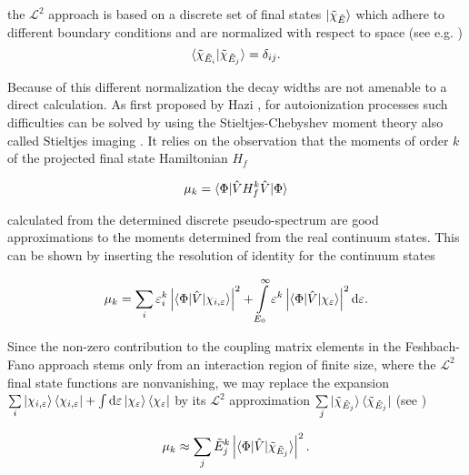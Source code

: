\documentclass[aps,amssymb,preprint,a4paper,longbibliography]{revtex4}
\begin{document}
the $\mathcal{L}^2$ approach is based on a discrete set of final states
$\ket{\tilde{\chi}_{\tilde{E}}}$
which adhere to different boundary
conditions and are normalized with respect to space (see e.g. \cite{Craigie14})
\begin{equation}
 \braket{ \tilde{\chi}_{\tilde{E}_i} | \tilde{\chi}_{\tilde{E}_j} } = \delta_{ij}.
\end{equation}

Because of this different normalization the decay widths are not amenable to
a direct calculation. As first proposed by Hazi \cite{hazi1978}, for
autoionization processes such difficulties
can be solved by using the
Stieltjes-Chebyshev moment theory also called Stieltjes imaging
\cite{Langhoff76,Corcoran77,MuellerPlathe90}.
It relies on the observation that the moments of order $k$ of the projected final
state Hamiltonian $H_f$

\begin{equation}
 \mu_k = \braket{ \Phi | \hat{V} H^k_f \hat{V} | \Phi }
\end{equation}

calculated from the determined
discrete pseudo-spectrum are good approximations to the moments determined
from the real continuum states.
This can be shown by inserting the resolution of identity for
the continuum states

\begin{equation}
 \mu_k = \sum_i \varepsilon_i^k
         \left| \braket{ \Phi | \hat{V} | \chi_{i,\varepsilon} } \right| ^2
       + \int\limits_{E_{0}}^{\infty} \varepsilon^k
         \left| \braket{\Phi|\hat{V}|\chi_{\varepsilon}} \right|^2 \mathrm{d}\varepsilon  .
\end{equation}

Since the non-zero contribution to the coupling matrix elements in the
Feshbach-Fano approach stems only
from an interaction region of finite size, where the $\mathcal{L}^2$ final
state functions are nonvanishing, we may replace the expansion
$\sum\limits_i \ket{\chi_{i,\varepsilon}} \bra{\chi_{i,\varepsilon}}
 + \int \mathrm{d}\varepsilon \ket{\chi_\varepsilon} \bra{\chi_\varepsilon}$
by its $\mathcal{L}^2$ approximation
$\sum\limits_j \ket{\tilde{\chi}_{\tilde{E}_j}} \bra{\tilde{\chi}_{\tilde{E}_j}}$
(see \cite{Reinhardt79})

\begin{equation}
 \label{eq:moment_discrete}
 \mu_k \approx \sum\limits_j \tilde{E}_j ^k
         \left| \braket{\Phi|\hat{V}|\tilde{\chi}_{\tilde{E}_j}}  \right|^2 .
\end{equation}
\end{document}
